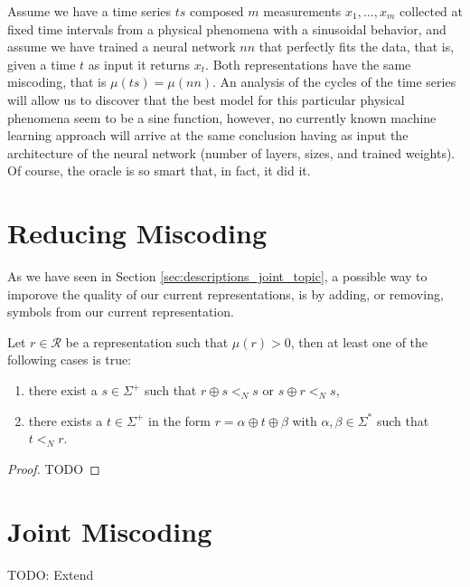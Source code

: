 \begin{example}
Assume we have a time series $ts$ composed $m$ measurements $x_1, \ldots, x_m$ collected at fixed time intervals from a physical phenomena with a sinusoidal behavior, and assume we have trained a neural network $nn$ that perfectly fits the data, that is, given a time $t$ as input it returns $x_t$. Both representations have the same miscoding, that is $\mu(ts) = \mu(nn)$. An analysis of the cycles of the time series will allow us to discover that the best model for this particular physical phenomena seem to be a sine function, however, no currently known machine learning approach will arrive at the same conclusion having as input the architecture of the neural network (number of layers, sizes, and trained weights). Of course, the oracle is so smart that, in fact, it did it.
\end{example}

%
%
\section{Reducing Miscoding}

As we have seen in Section \ref{sec:descriptions_joint_topic}, a possible way to imporove the quality of our current representations, is by adding, or removing, symbols from our current representation.

\begin{theorem}
Let $r \in \mathcal{R}$ be a representation such that $\mu(r) >0$, then at least one of the following cases is true:
\begin{enumerate}[label=(\roman*)]
\item there exist a $s \in \Sigma^{+}$ such that $r \oplus s <_N s$ or $s \oplus r <_N s$,
\item there exists a $t \in \Sigma^{+}$ in the form $r = \alpha \oplus t \oplus \beta$ with $\alpha, \beta \in \Sigma^\ast$ such that $t <_N r$.
\end{enumerate}
\end{theorem}
\begin{proof}
{\color{red} TODO}
\end{proof}


%
%
\section{Joint Miscoding}
\label{sec:joint_miscoding}


{\color{red} TODO: Extend}

